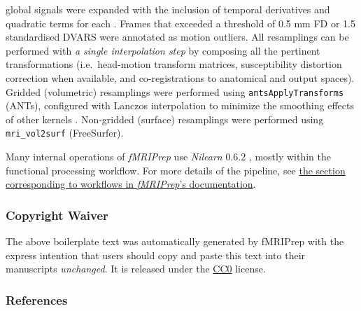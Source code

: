 \documentclass[]{article}
\begin{document}
\begin{description}
global signals were expanded with the inclusion of temporal derivatives
and quadratic terms for each \citep{confounds_satterthwaite_2013}.
Frames that exceeded a threshold of 0.5 mm FD or 1.5 standardised DVARS
were annotated as motion outliers. All resamplings can be performed with
\emph{a single interpolation step} by composing all the pertinent
transformations (i.e.~head-motion transform matrices, susceptibility
distortion correction when available, and co-registrations to anatomical
and output spaces). Gridded (volumetric) resamplings were performed
using \texttt{antsApplyTransforms} (ANTs), configured with Lanczos
interpolation to minimize the smoothing effects of other kernels
\citep{lanczos}. Non-gridded (surface) resamplings were performed using
\texttt{mri\_vol2surf} (FreeSurfer).
\end{description}

Many internal operations of \emph{fMRIPrep} use \emph{Nilearn} 0.6.2
\citep[RRID:SCR\_001362]{nilearn}, mostly within the functional
processing workflow. For more details of the pipeline, see
\href{https://fmriprep.readthedocs.io/en/latest/workflows.html}{the
section corresponding to workflows in \emph{fMRIPrep}'s documentation}.

\hypertarget{copyright-waiver}{%
\subsubsection{Copyright Waiver}\label{copyright-waiver}}

The above boilerplate text was automatically generated by fMRIPrep with
the express intention that users should copy and paste this text into
their manuscripts \emph{unchanged}. It is released under the
\href{https://creativecommons.org/publicdomain/zero/1.0/}{CC0} license.

\hypertarget{references}{%
\subsubsection{References}\label{references}}


\end{document}
